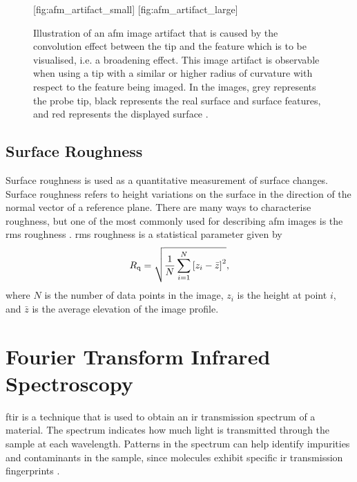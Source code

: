 \begin{figure}[htbp]
    \centering
    [fig:afm_artifact_small]
    \hfill
    [fig:afm_artifact_large]
    \caption[Illustration of the convolution effect in an \ac{afm} image due to tip size.]{Illustration of an \ac{afm} image artifact that is caused by the convolution effect between the tip and the feature which is to be visualised, i.e. a broadening effect. This image artifact is observable when using a tip with  a similar or  higher radius of curvature with respect to the feature being imaged. In the images, grey represents the probe tip, black represents the real surface and surface features, and red represents the displayed surface \citep[Adapted from][]{psia2002xe100}.}
    \label{fig:afm_tip-convolution}
\end{figure}

\subsection{Surface Roughness}

Surface roughness is used as a quantitative measurement of surface changes. Surface roughness refers to height variations on the surface in the direction of the normal vector of a reference plane. There are many ways to characterise roughness, but one of the most commonly used for describing \ac{afm} images is the \ac{rms} roughness \citep{eaton2010atomic}. \Ac{rms} roughness is a statistical parameter given by \citep{thomas1999amplitude}
\begin{equation}\label{eq:rmsroughness}
R_\textrm{q} = \sqrt{\frac{1}{N}\sum_{i=1}^{N}\left[ z_i-\bar{z} \right]^2},
\end{equation}
where $N$ is the number of data points in the image, $z_i$ is the height at point $i$, and $\bar{z}$ is the average elevation of the image profile. %

\section{Fourier Transform Infrared Spectroscopy}\label{sec:ftir}
\Acf{ftir} is a technique that is used to obtain an \ac{ir} transmission spectrum of a material. The spectrum indicates how much light is transmitted through the sample at each wavelength. Patterns in the spectrum can help identify impurities and contaminants in the sample, since molecules exhibit specific \ac{ir} transmission fingerprints \citep{smith2011fourier}.

